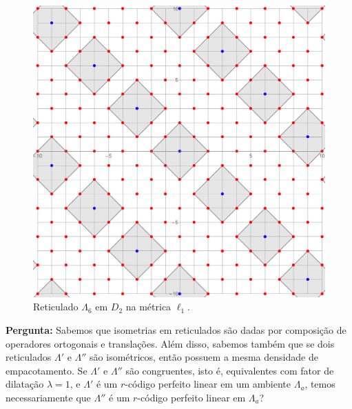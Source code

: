 \documentclass{article}
\theoremstyle{plain}
\theoremstyle{definition}
\theoremstyle{remark}
\begin{document}
\begin{figure}[ht]
  \centering
  \includegraphics[scale=0.23]{notperfect.pdf}
  \caption{Reticulado $\Lambda_6$ em $D_2$ na métrica $\ell_1$.}
\end{figure}

\hspace{-0.5cm}\textbf{Pergunta:} Sabemos que isometrias em reticulados são dadas por composição de operadores ortogonais e translações. Além disso, sabemos também que se dois reticulados $\Lambda'$ e $\Lambda''$ são isométricos, então possuem a mesma densidade de empacotamento. Se $\Lambda'$ e $\Lambda''$ são congruentes, isto é, equivalentes com fator de dilatação $\lambda=1$, e $\Lambda'$ é um $r$-código perfeito linear em um ambiente $\Lambda_a$, temos necessariamente que $\Lambda''$ é um $r$-código perfeito linear em $\Lambda_a$?
\end{document}
